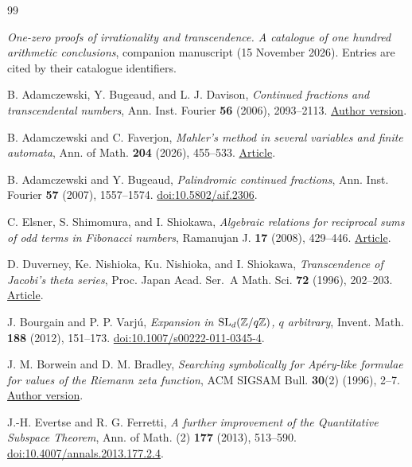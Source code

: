 \documentclass[11pt,a4paper]{article}
\begin{document}
\clearpage{}
\begin{thebibliography}{99}\small

 \emph{One-zero proofs of irrationality and transcendence. A catalogue of one hundred arithmetic conclusions}, companion manuscript (15 November 2026). Entries are cited by their catalogue identifiers.

 B. Adamczewski, Y. Bugeaud, and L. J. Davison, \emph{Continued fractions and transcendental numbers}, Ann. Inst. Fourier \textbf{56} (2006), 2093--2113. \href{https://arxiv.org/abs/math/0511682}{Author version}.

 B. Adamczewski and C. Faverjon, \emph{Mahler's method in several variables and finite automata}, Ann. of Math. \textbf{204} (2026), 455--533. \href{https://doi.org/10.4007/annals.2026.204.2.1}{Article}.

 B. Adamczewski and Y. Bugeaud, \emph{Palindromic continued fractions}, Ann. Inst. Fourier \textbf{57} (2007), 1557--1574. \href{https://doi.org/10.5802/aif.2306}{doi:10.5802/aif.2306}.

 C. Elsner, S. Shimomura, and I. Shiokawa, \emph{Algebraic relations for reciprocal sums of odd terms in Fibonacci numbers}, Ramanujan J. \textbf{17} (2008), 429--446. \href{https://doi.org/10.1007/s11139-007-9019-7}{Article}.

 D. Duverney, Ke. Nishioka, Ku. Nishioka, and I. Shiokawa, \emph{Transcendence of Jacobi's theta series}, Proc. Japan Acad. Ser.~A Math. Sci. \textbf{72} (1996), 202--203. \href{https://doi.org/10.3792/pjaa.72.202}{Article}.

 J. Bourgain and P. P. Varj\'u, \emph{Expansion in \(\mathrm{SL}_d(\mathbb Z/q\mathbb Z)\), \(q\) arbitrary}, Invent. Math. \textbf{188} (2012), 151--173. \href{https://doi.org/10.1007/s00222-011-0345-4}{doi:10.1007/s00222-011-0345-4}.

 J. M. Borwein and D. M. Bradley, \emph{Searching symbolically for Ap\'ery-like formulae for values of the Riemann zeta function}, ACM SIGSAM Bull. \textbf{30}(2) (1996), 2--7. \href{https://arxiv.org/abs/math/0505093}{Author version}.

 J.-H. Evertse and R. G. Ferretti, \emph{A further improvement of the Quantitative Subspace Theorem}, Ann. of Math. (2) \textbf{177} (2013), 513--590. \href{https://doi.org/10.4007/annals.2013.177.2.4}{doi:10.4007/annals.2013.177.2.4}.


\end{thebibliography}
\end{document}
